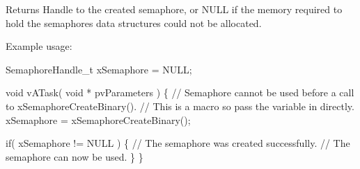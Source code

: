 \begin{DoxyReturn}{Returns}
Handle to the created semaphore, or N\+U\+LL if the memory required to hold the semaphore\textquotesingle{}s data structures could not be allocated.
\end{DoxyReturn}
Example usage\+: 
\begin{DoxyPre}
SemaphoreHandle\_t xSemaphore = NULL;\end{DoxyPre}



\begin{DoxyPre}void vATask( void * pvParameters )
\{
   // Semaphore cannot be used before a call to xSemaphoreCreateBinary().
   // This is a macro so pass the variable in directly.
   xSemaphore = xSemaphoreCreateBinary();\end{DoxyPre}



\begin{DoxyPre}   if( xSemaphore != NULL )
   \{
       // The semaphore was created successfully.
       // The semaphore can now be used.
   \}
\}
\end{DoxyPre}
 